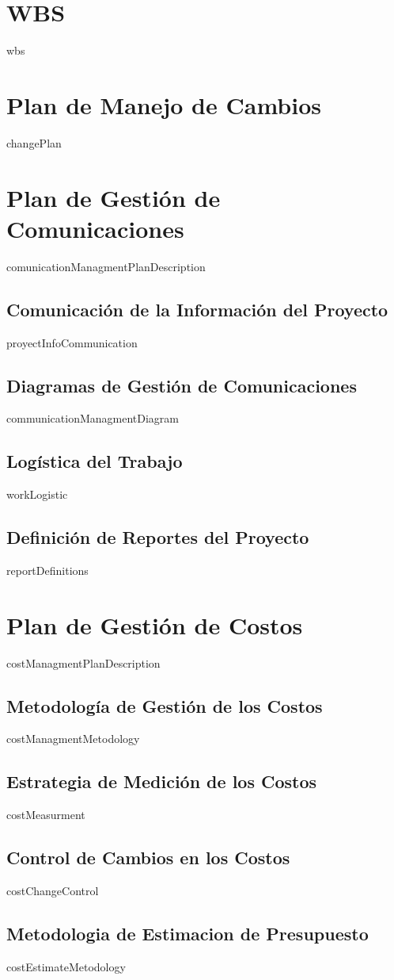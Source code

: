 \documentclass{article}
\begin{document}
\section{WBS}
{{wbs}}
\section{Plan de Manejo de Cambios}
{{changePlan}}
\section{Plan de Gestión de Comunicaciones}
{{comunicationManagmentPlanDescription}}
\subsection{Comunicación de la Información del Proyecto}
{{proyectInfoCommunication}}
\subsection{Diagramas de Gestión de Comunicaciones}
{{communicationManagmentDiagram}}
\subsection{Logística del Trabajo}
{{workLogistic}}
\subsection{Definición de Reportes del Proyecto}
{{reportDefinitions}}
\section{Plan de Gestión de Costos}
{{costManagmentPlanDescription}}
\subsection{Metodología de Gestión de los Costos}
{{costManagmentMetodology}}
\subsection{Estrategia de Medición de los Costos}
{{costMeasurment}}
\subsection{Control de Cambios en los Costos}
{{costChangeControl}}
\subsection{Metodologia de Estimacion de Presupuesto}
{{costEstimateMetodology}}
\end{document}
